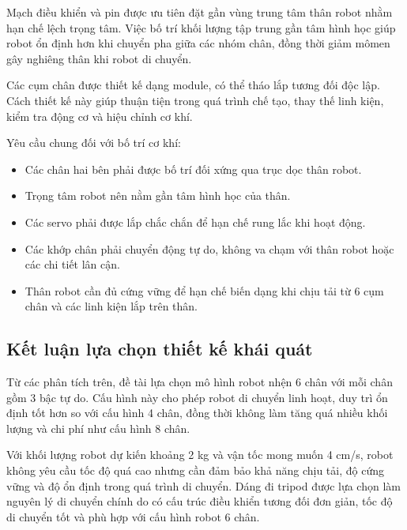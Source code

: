             \hspace{0.5cm} Mạch điều khiển và pin được ưu tiên đặt gần vùng trung tâm thân robot nhằm hạn chế lệch trọng tâm. Việc bố trí khối lượng tập trung gần tâm hình học giúp robot ổn định hơn khi chuyển pha giữa các nhóm chân, đồng thời giảm mômen gây nghiêng thân khi robot di chuyển.

            \hspace{0.5cm} Các cụm chân được thiết kế dạng module, có thể tháo lắp tương đối độc lập. Cách thiết kế này giúp thuận tiện trong quá trình chế tạo, thay thế linh kiện, kiểm tra động cơ và hiệu chỉnh cơ khí.

            \hspace{0.5cm} Yêu cầu chung đối với bố trí cơ khí:
            \begin{itemize}
                \item Các chân hai bên phải được bố trí đối xứng qua trục dọc thân robot.
                \item Trọng tâm robot nên nằm gần tâm hình học của thân.
                \item Các servo phải được lắp chắc chắn để hạn chế rung lắc khi hoạt động.
                \item Các khớp chân phải chuyển động tự do, không va chạm với thân robot hoặc các chi tiết lân cận.
                \item Thân robot cần đủ cứng vững để hạn chế biến dạng khi chịu tải từ 6 cụm chân và các linh kiện lắp trên thân.
            \end{itemize}

        \subsection{Kết luận lựa chọn thiết kế khái quát}

            \hspace{0.5cm} Từ các phân tích trên, đề tài lựa chọn mô hình robot nhện 6 chân với mỗi chân gồm 3 bậc tự do. Cấu hình này cho phép robot di chuyển linh hoạt, duy trì ổn định tốt hơn so với cấu hình 4 chân, đồng thời không làm tăng quá nhiều khối lượng và chi phí như cấu hình 8 chân.

            \hspace{0.5cm} Với khối lượng robot dự kiến khoảng 2 kg và vận tốc mong muốn 4 cm/s, robot không yêu cầu tốc độ quá cao nhưng cần đảm bảo khả năng chịu tải, độ cứng vững và độ ổn định trong quá trình di chuyển. Dáng đi tripod được lựa chọn làm nguyên lý di chuyển chính do có cấu trúc điều khiển tương đối đơn giản, tốc độ di chuyển tốt và phù hợp với cấu hình robot 6 chân.


